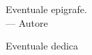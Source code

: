 
\thispagestyle{empty}
{}

\vspace*{3cm}

\begin{center}
    Eventuale epigrafe. \\ \medskip
     --- Autore    
\end{center}

\medskip

\begin{center}
    Eventuale dedica
\end{center}
